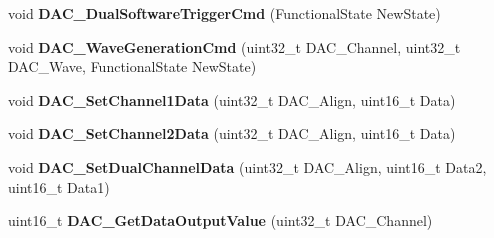 \begin{DoxyCompactItemize}
\item 
\hypertarget{group__DAC__Exported__Functions_gab4d3b364a6b184dcd65f3b294ebf56dc}{
void {\bfseries DAC\_\-DualSoftwareTriggerCmd} (FunctionalState NewState)}
\label{group__DAC__Exported__Functions_gab4d3b364a6b184dcd65f3b294ebf56dc}

\item 
\hypertarget{group__DAC__Exported__Functions_gabd51ae6880821d4dcd923969ec19a19e}{
void {\bfseries DAC\_\-WaveGenerationCmd} (uint32\_\-t DAC\_\-Channel, uint32\_\-t DAC\_\-Wave, FunctionalState NewState)}
\label{group__DAC__Exported__Functions_gabd51ae6880821d4dcd923969ec19a19e}

\item 
\hypertarget{group__DAC__Exported__Functions_gad06b4230d2b17d1d13f41dce4c782461}{
void {\bfseries DAC\_\-SetChannel1Data} (uint32\_\-t DAC\_\-Align, uint16\_\-t Data)}
\label{group__DAC__Exported__Functions_gad06b4230d2b17d1d13f41dce4c782461}

\item 
\hypertarget{group__DAC__Exported__Functions_ga44e12006ec186791378d132da8541552}{
void {\bfseries DAC\_\-SetChannel2Data} (uint32\_\-t DAC\_\-Align, uint16\_\-t Data)}
\label{group__DAC__Exported__Functions_ga44e12006ec186791378d132da8541552}

\item 
\hypertarget{group__DAC__Exported__Functions_ga4ca2cfdf56ab35a23f2517f23d7fbb24}{
void {\bfseries DAC\_\-SetDualChannelData} (uint32\_\-t DAC\_\-Align, uint16\_\-t Data2, uint16\_\-t Data1)}
\label{group__DAC__Exported__Functions_ga4ca2cfdf56ab35a23f2517f23d7fbb24}

\item 
\hypertarget{group__DAC__Exported__Functions_ga51274838de1e5dd012a82d7f44d7a50b}{
uint16\_\-t {\bfseries DAC\_\-GetDataOutputValue} (uint32\_\-t DAC\_\-Channel)}
\label{group__DAC__Exported__Functions_ga51274838de1e5dd012a82d7f44d7a50b}

\end{DoxyCompactItemize}
